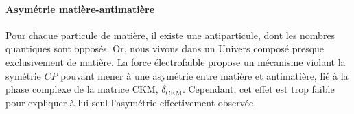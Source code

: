 \paragraph{Asymétrie matière-antimatière}
Pour chaque particule de matière, il existe une antiparticule, dont les nombres quantiques sont opposés.
Or, nous vivons dans un Univers composé presque exclusivement de matière.
La force électrofaible propose un mécanisme violant la symétrie $CP$ pouvant mener à une asymétrie entre matière et antimatière, lié à la phase complexe de la matrice CKM, $\delta_{\text{CKM}}$.
Cependant, cet effet est trop faible pour expliquer à lui seul l'asymétrie effectivement observée.
